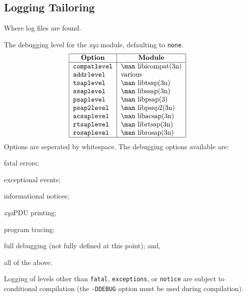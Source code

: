 \subsection	{Logging Tailoring}
\begin{describe}
\item[\verb"logpath":] Where log files are found.

\item[\em xyz\/\verb"level":] The debugging level for the {\em xyz\/}
module,
defaulting to \verb"none".
\[\begin{tabular}{|l|l|}
\hline
    \multicolumn{1}{|c|}{\bf Option}&
		\multicolumn{1}{c|}{\bf Module}\\
\hline
    \tt compatlevel&	\man libicompat(3n)\\
    \tt addrlevel&	various\\
    \tt tsaplevel&	\man libtsap(3n)\\
    \tt ssaplevel&	\man libssap(3n)\\
    \tt psaplevel&	\man libpsap(3)\\
    \tt psap2level&	\man libpsap2(3n)\\
    \tt acsaplevel&	\man libacsap(3n)\\
    \tt rtsaplevel&	\man librtsap(3n)\\
    \tt rosaplevel&	\man librosap(3n)\\
\hline
\end{tabular}\]
Options are seperated by whitespace.
The debugging options available are:
\begin{describe}
\item[\verb"fatal":] fatal errors;

\item[\verb"exceptions":] exceptional events;

\item[\verb"notice":] informational notices;

\item[\verb"pdus":] {\em xyz\/}PDU printing;

\item[\verb"trace":] program tracing;

\item[\verb"debug":] full debugging
(not fully defined at this point);
and,

\item[\verb"all":] all of the above.
\end{describe}
Logging of levels other than \verb"fatal",
\verb"exceptions", or \verb"notice" are subject
to conditional compilation
(the \verb"-DDEBUG" option must be used during compilation).


\end{describe}
